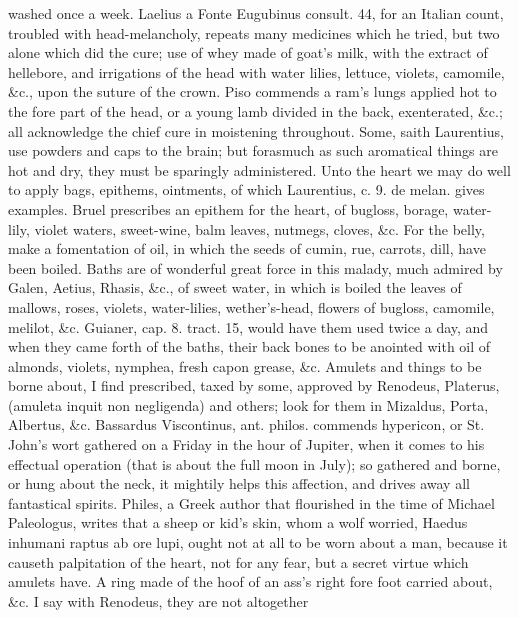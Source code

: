 washed once a week. Laelius a Fonte Eugubinus consult. 44, for an
Italian count, troubled with head-melancholy, repeats many medicines
which he tried, but two alone which did the cure; use of whey
made of goat's milk, with the extract of hellebore, and irrigations of
the head with water lilies, lettuce, violets, camomile, \&c., upon the
suture of the crown. Piso commends a ram's lungs applied hot to the
fore part of the head, or a young lamb divided in the back,
exenterated, \&c.; all acknowledge the chief cure in moistening
throughout. Some, saith Laurentius, use powders and caps to the brain;
but forasmuch as such aromatical things are hot and dry, they must be
sparingly administered.
Unto the heart we may do well to apply bags, epithems, ointments, of
which Laurentius, c. 9. de melan. gives examples. Bruel prescribes an
epithem for the heart, of bugloss, borage, water-lily, violet waters,
sweet-wine, balm leaves, nutmegs, cloves, \&c.
For the belly, make a fomentation of oil, in which the seeds of
cumin, rue, carrots, dill, have been boiled.
Baths are of wonderful great force in this malady, much admired by
 Galen, Aetius, Rhasis, \&c., of sweet water, in which is
boiled the leaves of mallows, roses, violets, water-lilies,
wether's-head, flowers of bugloss, camomile, melilot, \&c. Guianer, cap.
8. tract. 15, would have them used twice a day, and when they came
forth of the baths, their back bones to be anointed with oil of
almonds, violets, nymphea, fresh capon grease, \&c.
Amulets and things to be borne about, I find prescribed, taxed by some,
approved by Renodeus, Platerus, (amuleta inquit non negligenda) and
others; look for them in Mizaldus, Porta, Albertus, \&c. Bassardus
Viscontinus, ant. philos. commends hypericon, or St. John's wort
gathered on a Friday in the hour of Jupiter, when it comes to his
effectual operation (that is about the full moon in July); so gathered
and borne, or hung about the neck, it mightily helps this affection,
and drives away all fantastical spirits. Philes, a Greek author
that flourished in the time of Michael Paleologus, writes that a sheep
or kid's skin, whom a wolf worried, Haedus inhumani raptus ab ore
lupi, ought not at all to be worn about a man, because it causeth
palpitation of the heart, not for any fear, but a secret virtue which
amulets have. A ring made of the hoof of an ass's right fore foot
carried about, \&c. I say with Renodeus, they are not altogether

